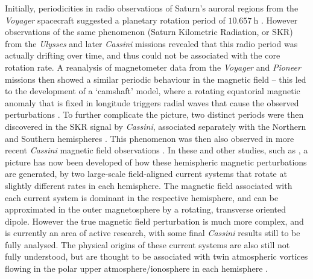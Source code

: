 {Initially, periodicities in radio observations of Saturn's auroral regions from the \textit{Voyager} spacecraft suggested a planetary rotation period of $\SI{10.657}{\hour}$ \citep{desch1981}. However observations of the same phenomenon (Saturn Kilometric Radiation, or SKR) from the \textit{Ulysses} \citep{lecacheux1997} and later \textit{Cassini} \citep{gurnett2005} missions revealed that this radio period was actually drifting over time, and thus could not be associated with the core rotation rate. A reanalysis of magnetometer data from the \textit{Voyager} and \textit{Pioneer} missions then showed a similar periodic behaviour in the magnetic field – this led to the development of a `camshaft' model, where a rotating equatorial magnetic anomaly that is fixed in longitude triggers radial waves that cause the observed perturbations \citep{espinosa2003b}. To further complicate the picture, two distinct periods were then discovered in the SKR signal by \textit{Cassini}, associated separately with the Northern and Southern hemispheres \citep{gurnett2009}. This phenomenon was then also observed in more recent \textit{Cassini} magnetic field observations \citep[e.g.][]{andrews2010,provan2012}. In these and other studies, such as \citet{hunt2014}, a picture has now been developed of how these hemispheric magnetic perturbations are generated, by two large-scale field-aligned current systems that rotate at slightly different rates in each hemisphere. The magnetic field associated with each current system is dominant in the respective hemisphere, and can  be approximated in the outer magnetosphere by a rotating, transverse oriented dipole. However the true magnetic field perturbation is much more complex, and is currently an area of active research, with some final \textit{Cassini} results still to be fully analysed. The physical origins of these current systems are also still not fully understood, but are thought to be associated with twin atmospheric vortices flowing in the polar upper atmosphere/ionosphere in each hemisphere \citep{jiaandkivelson2012, southwood2014, smith2016}. 

}
